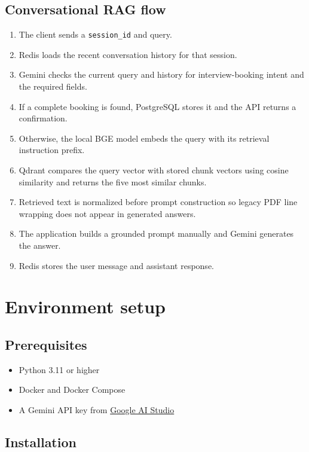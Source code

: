\documentclass[12pt, a4paper]{article}
\begin{document}
\subsection{Conversational RAG flow}

\begin{enumerate}[leftmargin=1.5em]
    \item The client sends a \texttt{session\_id} and query.
    \item Redis loads the recent conversation history for that session.
    \item Gemini checks the current query and history for interview-booking
    intent and the required fields.
    \item If a complete booking is found, PostgreSQL stores it and the API
    returns a confirmation.
    \item Otherwise, the local BGE model embeds the query with its retrieval
    instruction prefix.
    \item Qdrant compares the query vector with stored chunk vectors using
    cosine similarity and returns the five most similar chunks.
    \item Retrieved text is normalized before prompt construction so legacy
    PDF line wrapping does not appear in generated answers.
    \item The application builds a grounded prompt manually and Gemini
    generates the answer.
    \item Redis stores the user message and assistant response.
\end{enumerate}

\section{Environment setup}

\subsection{Prerequisites}

\begin{itemize}[leftmargin=1.5em]
    \item Python 3.11 or higher
    \item Docker and Docker Compose
    \item A Gemini API key from
    \href{https://aistudio.google.com/app/apikey}{Google AI Studio}
\end{itemize}

\subsection{Installation}
\end{document}
